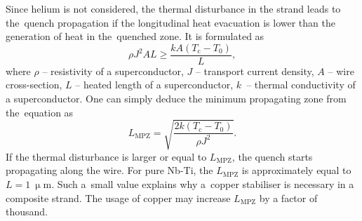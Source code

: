 Since helium is not considered, the thermal disturbance in the strand leads to the~quench propagation if the longitudinal heat evacuation is lower than the generation of heat in the~quenched zone. It is formulated as
\begin{equation}
    \rho J^2 A L \geq \frac{kA(T_\text{c}-T_0)}{L},
\end{equation}
where $\rho$ -- resistivity of a superconductor, $J$ -- transport current density, $A$ -- wire cross-section, $L$ -- heated length of a superconductor, $k$~-- thermal conductivity of a superconductor. One can simply deduce the minimum propagating zone from the~equation as
\begin{equation}
    L_\text{MPZ} = \sqrt{\frac{2k(T_\text{c}-T_0)}{\rho J^2}}.
\end{equation}
If the thermal disturbance is larger or equal to $L_\text{MPZ}$, the quench starts propagating along the wire. For pure Nb-Ti, the $L_\text{MPZ}$ is approximately equal to $L=1~\upmu \text{m}$. Such a~small value explains why a~copper stabiliser is necessary in a composite strand. The usage of copper may increase $L_\text{MPZ}$ by a factor of thousand. 





